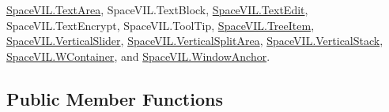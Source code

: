\mbox{\hyperlink{class_space_v_i_l_1_1_text_area}{Space\+V\+I\+L.\+Text\+Area}}, Space\+V\+I\+L.\+Text\+Block, \mbox{\hyperlink{class_space_v_i_l_1_1_text_edit}{Space\+V\+I\+L.\+Text\+Edit}}, Space\+V\+I\+L.\+Text\+Encrypt, Space\+V\+I\+L.\+Tool\+Tip, \mbox{\hyperlink{class_space_v_i_l_1_1_tree_item}{Space\+V\+I\+L.\+Tree\+Item}}, \mbox{\hyperlink{class_space_v_i_l_1_1_vertical_slider}{Space\+V\+I\+L.\+Vertical\+Slider}}, \mbox{\hyperlink{class_space_v_i_l_1_1_vertical_split_area}{Space\+V\+I\+L.\+Vertical\+Split\+Area}}, \mbox{\hyperlink{class_space_v_i_l_1_1_vertical_stack}{Space\+V\+I\+L.\+Vertical\+Stack}}, \mbox{\hyperlink{class_space_v_i_l_1_1_w_container}{Space\+V\+I\+L.\+W\+Container}}, and \mbox{\hyperlink{class_space_v_i_l_1_1_window_anchor}{Space\+V\+I\+L.\+Window\+Anchor}}.

\subsection*{Public Member Functions}
